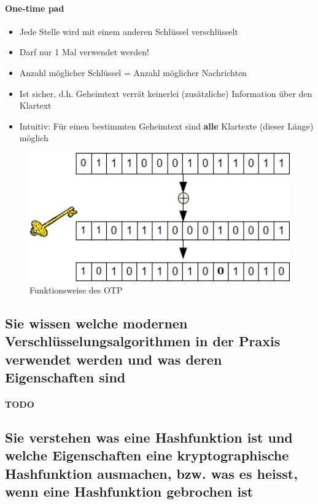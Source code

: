 \documentclass[10pt,a4paper]{article}
\begin{document}
\paragraph*{One-time pad}
\begin{itemize}[noitemsep,topsep=0pt,leftmargin=*]
    \item Jede Stelle wird mit einem anderen Schlüssel verschlüsselt
    \item Darf nur 1 Mal verwendet werden!
    \item Anzahl möglicher Schlüssel = Anzahl möglicher Nachrichten
    \item Ist sicher, d.h. Geheimtext verrät keinerlei (zusätzliche) Information über den Klartext
    \item Intuitiv: Für einen bestimmten Geheimtext sind \textbf{alle} Klartexte (dieser Länge) möglich
\end{itemize}
\begin{figure}[H]
    \begin{center}
    \includegraphics[width=12cm]{images/otp.png}
    \caption{Funktionsweise des OTP}
    \label{otp}
    \end{center}
\end{figure}


\subsection*{Sie wissen welche modernen Verschlüsselungsalgorithmen in der Praxis verwendet werden und was deren Eigenschaften sind}
\paragraph*{TODO}


\subsection*{Sie verstehen was eine Hashfunktion ist und welche Eigenschaften eine kryptographische Hashfunktion ausmachen, bzw. was es heisst, wenn eine Hashfunktion gebrochen ist}
\end{document}
